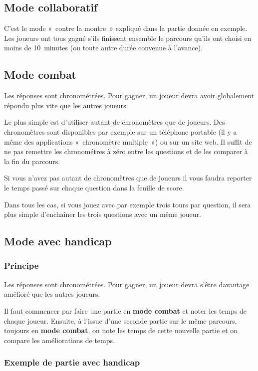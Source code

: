 \documentclass[11pt]{article}
\newcommand{\mode}[1]
{\textbf{#1}}
\begin{document}
\subsection{Mode collaboratif}

C’est le mode « contre la montre » expliqué dans la partie donnée en exemple.
Les joueurs ont tous gagné s’ils finissent ensemble le parcours qu’ils ont
choisi en moins de 10 minutes (ou toute autre durée convenue à l’avance).

\subsection{Mode combat}

Les réponses sont chronométrées. Pour gagner, un joueur devra avoir
globalement répondu plus vite que les autres joueurs.

Le plus simple est d’utiliser autant de chronomètres que de joueurs.
Des chronomètres sont disponibles par exemple sur un téléphone portable (il y
a même des applications « chronomètre multiple ») ou sur un site web. Il suffit
de ne pas remettre les chronométres à zéro entre les questions et de les
comparer à la fin du parcours.

Si vous n’avez pas autant de chronomètres que de joueurs il vous faudra
reporter le temps passé sur chaque question dans la feuille de score.

Dans tous les cas, si vous jouez avec par exemple trois tours par question, il
sera plus simple d’enchaîner les trois questions avec un même joueur.

\subsection{Mode avec handicap}

\subsubsection{Principe}

Les réponses sont chronométrées. Pour gagner, un joueur devra s’être davantage
amélioré que les autres joueurs.

Il faut commencer par faire une partie en \mode{mode combat} et noter les temps
de chaque joueur. Ensuite, à l’issue d’une seconde partie sur le même parcours,
toujours en \mode{mode combat}, on note les temps de cette nouvelle partie et
on compare les améliorations de temps.

\subsubsection{Exemple de partie avec handicap}
\end{document}
